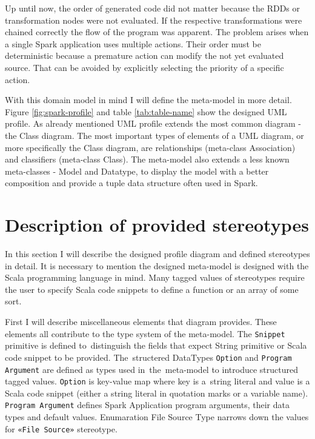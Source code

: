 Up until now, the order of generated code did not matter because the RDDs or transformation nodes were not evaluated. If the respective transformations were chained correctly the flow of the program was apparent. The problem arises when a single Spark application uses multiple actions. Their order must be deterministic because a premature action can modify the not yet evaluated source. That can be avoided by explicitly selecting the priority of a specific action.




With this domain model in mind I will define the meta-model in more detail. Figure \ref{fig:spark-profile} and table \ref{tab:table-name} show the designed UML profile. As already mentioned UML profile extends the most common diagram - the Class diagram. The most important types of elements of a UML diagram, or more specifically the Class diagram, are relationships (meta-class Association) and classifiers (meta-class Class). The meta-model also extends a less known meta-classes - Model and Datatype, to display the model with a better composition and provide a tuple data structure often used in Spark. 

\section{Description of provided stereotypes}

In this section I will describe the designed profile diagram and defined stereotypes in detail. 
It is necessary to mention the designed meta-model is designed with the Scala programming language in mind. Many tagged values of stereotypes require the user to specify Scala code snippets to define a function or an array of some sort. 


First I will describe miscellaneous elements that diagram provides. These elements all contribute to the type system of the meta-model. The \texttt{Snippet} primitive is defined to~distinguish the fields that expect String primitive or Scala code snippet to be provided. The~structered DataTypes \texttt{Option} and \texttt{Program Argument} are defined as types used in~the~meta-model to introduce structured tagged values. \texttt{Option} is key-value map where key is a~string literal and value is a Scala code snippet (either a string literal in quotation marks or a variable name). \texttt{Program Argument} defines Spark Application program arguments, their data types and default values. Enumaration File Source Type narrows down the values for \texttt{«File Source»} stereotype. 



